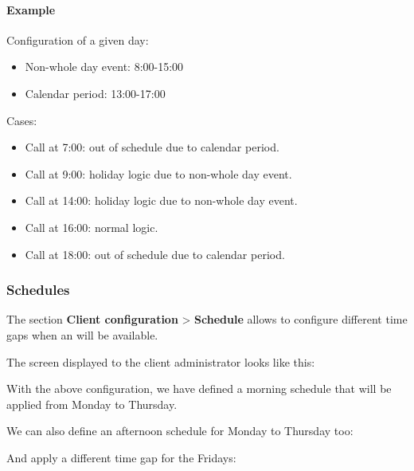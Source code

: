 \documentclass[letterpaper,10pt,spanish]{sphinxmanual}
\begin{document}
\paragraph{Example}

Configuration of a given day:
\begin{itemize}
\item {} 
Non-whole day event: 8:00-15:00

\item {} 
Calendar period: 13:00-17:00

\end{itemize}

Cases:
\begin{itemize}
\item {} 
Call at 7:00: out of schedule due to calendar period.

\item {} 
Call at 9:00: holiday logic due to non-whole day event.

\item {} 
Call at 14:00: holiday logic due to non-whole day event.

\item {} 
Call at 16:00: normal logic.

\item {} 
Call at 18:00: out of schedule due to calendar period.

\end{itemize}


\subsubsection{Schedules}
\label{administration_portal/client/vpbx/routing_tools/schedules:id1}\label{administration_portal/client/vpbx/routing_tools/schedules::doc}\label{administration_portal/client/vpbx/routing_tools/schedules:schedules}
The section \textbf{Client configuration} \textgreater{} \textbf{Schedule} allows to configure
different time gaps when an {\hyperref[administration_portal/brand/views/ddis:ddis]{}} will be available.

The screen displayed to the client administrator looks like this:

With the above configuration, we have defined a morning schedule that will be
applied from Monday to Thursday.

We can also define an afternoon schedule for Monday to Thursday too:

And apply a different time gap for the Fridays:
\end{document}
